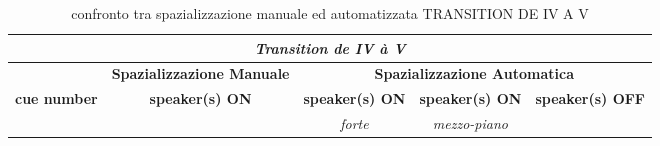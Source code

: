 \bigskip

\begin{table*}[h]

\caption{confronto tra spazializzazione manuale ed automatizzata TRANSITION DE IV A V}
\begin{center}
\begin{tabular}{c c c c c}

\hline
\multicolumn{5}{c}{\emph{\textbf{Transition de IV à V}}} \\
\hline

	&
\multicolumn{1}{c}{\textbf{Spazializzazione Manuale}} &
\multicolumn{3}{c}{\textbf{Spazializzazione Automatica}} \\

\hline

\textbf{cue number}		&
\textbf{speaker(s) ON }	&
\textbf{speaker(s) ON}	&
\textbf{speaker(s) ON}	&
\textbf{speaker(s) OFF}	\\

&
&
\emph{forte} &
\emph{mezzo-piano} &
\\


\end{tabular}
\end{center}
\end{table*}
